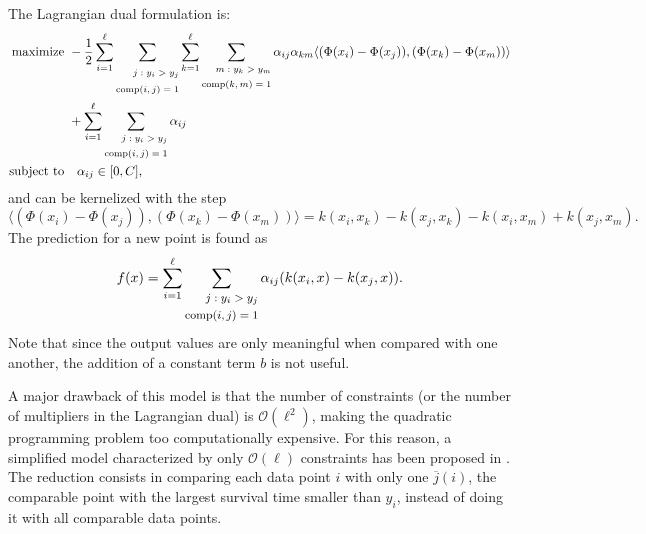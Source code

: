 \documentclass[12pt]{report}
\begin{document}
The Lagrangian dual formulation is:
\begin{equation} \label{ranksvmcdual}
\begin{split}
\text{maximize} &\
-\dfrac{1}{2}\sum_{i=1}^{\ell}\sum_{\scriptsize\begin{split} j:y_{i} > y_{j} \\ \text{comp}(i,j) = 1 \end{split}}\sum_{k=1}^{\ell}\sum_{\scriptsize\begin{split} m:y_{k} > y_{m} \\ \text{comp}(k,m) = 1 \end{split}}\alpha_{ij}\alpha_{km}\langle (\Phi(x_{i}) - \Phi(x_{j})),(\Phi(x_{k}) - \Phi(x_{m}))\rangle \\ &\ + \sum_{i=1}^{\ell}\sum_{\scriptsize\begin{split} j:y_{i} > y_{j} \\ \text{comp}(i,j) = 1 \end{split}}\alpha_{ij} \\
\text{subject to} &\quad \alpha_{ij} \in [0,C] \text{,}
\end{split}
\end{equation}
and can be kernelized with the step
\begin{equation} \label{ranksvmckern}
\langle (\Phi(x_{i}) - \Phi(x_{j})),(\Phi(x_{k}) - \Phi(x_{m}))\rangle = k(x_{i},x_{k})-k(x_{j},x_{k})-k(x_{i},x_{m})+k(x_{j},x_{m}) \text{.}
\end{equation}
The prediction for a new point is found as
\begin{equation} \label{ranksvmcf}
f(x) = \sum_{i=1}^{\ell}\sum_{\footnotesize\begin{split} j:y_{i} > y_{j} \\ \text{comp}(i,j) = 1 \end{split}}\alpha_{ij}(k(x_{i},x) - k(x_{j},x)) \text{.}
\end{equation}
Note that since the output values are only meaningful when compared with one another, the addition of a constant term $b$ is not useful.

A major drawback of this model is that the number of constraints (or the number of multipliers in the Lagrangian dual) is $\mathcal{O}(\ell^{2})$, making the quadratic programming problem too computationally expensive. For this reason, a simplified model characterized by only $\mathcal{O}(\ell)$ constraints has been proposed in \cite{vanbelle08}. The reduction consists in comparing each data point $i$ with only one $\overline{j}(i)$, the comparable point with the largest survival time smaller than $y_{i}$, instead of doing it with all comparable data points.
\end{document}
